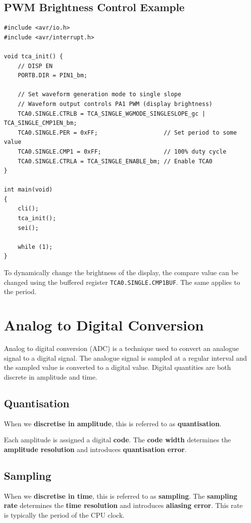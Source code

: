 \documentclass{report}
\begin{document}
\subsection{PWM Brightness Control Example}
\begin{verbatim}
#include <avr/io.h>
#include <avr/interrupt.h>

void tca_init() {
    // DISP EN
    PORTB.DIR = PIN1_bm;

    // Set waveform generation mode to single slope
    // Waveform output controls PA1 PWM (display brightness)
    TCA0.SINGLE.CTRLB = TCA_SINGLE_WGMODE_SINGLESLOPE_gc | TCA_SINGLE_CMP1EN_bm;
    TCA0.SINGLE.PER = 0xFF;                   // Set period to some value
    TCA0.SINGLE.CMP1 = 0xFF;                  // 100% duty cycle
    TCA0.SINGLE.CTRLA = TCA_SINGLE_ENABLE_bm; // Enable TCA0
}

int main(void)
{
    cli();
    tca_init();
    sei();

    while (1);
}
\end{verbatim}
To dynamically change the brightness of the display, the compare value can be changed
using the buffered register \texttt{TCA0.SINGLE.CMP1BUF}. The same applies to the
period.
\section{Analog to Digital Conversion}
Analog to digital conversion (ADC) is a technique used to convert an analogue signal
to a digital signal. The analogue signal is sampled at a regular interval and the
sampled value is converted to a digital value.
Digital quantities are both discrete in amplitude and time.
\subsection{Quantisation}
When we \textbf{discretise in amplitude}, this is referred to as \textbf{quantisation}.

Each amplitude is assigned a digital \textbf{code}. The \textbf{code width}
determines the \textbf{amplitude resolution} and introduces \textbf{quantisation error}.
\subsection{Sampling}
When we \textbf{discretise in time}, this is referred to as \textbf{sampling}.
The \textbf{sampling rate} determines the \textbf{time resolution} and introduces \textbf{aliasing error}.
This rate is typically the period of the CPU clock.
\end{document}
